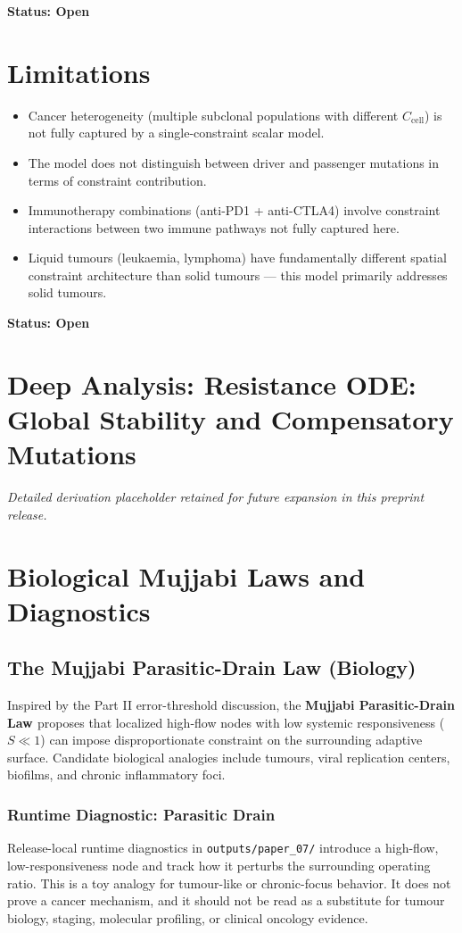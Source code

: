 \documentclass[12pt,a4paper]{article}
\begin{document}
\textbf{Status: Open}

\section{Limitations}

\begin{itemize}
    \item Cancer heterogeneity (multiple subclonal populations with different $C_{\mathrm{cell}}$) is not fully captured by a single-constraint scalar model.
    \item The model does not distinguish between driver and passenger mutations in terms of constraint contribution.
    \item Immunotherapy combinations (anti-PD1 + anti-CTLA4) involve constraint interactions between two immune pathways not fully captured here.
    \item Liquid tumours (leukaemia, lymphoma) have fundamentally different spatial constraint architecture than solid tumours --- this model primarily addresses solid tumours.
\end{itemize}

\textbf{Status: Open}


\section{Deep Analysis: Resistance ODE: Global Stability and Compensatory Mutations}
\noindent\textit{Detailed derivation placeholder retained for future expansion in this preprint release.}


\section{Biological Mujjabi Laws and Diagnostics}

\subsection{The Mujjabi Parasitic-Drain Law \cite{MujjabiPartII2026} (Biology)}
Inspired by the Part II error-threshold discussion, the \textbf{Mujjabi Parasitic-Drain Law \cite{MujjabiPartII2026}} proposes that localized high-flow nodes with low systemic responsiveness ($S \ll 1$) can impose disproportionate constraint on the surrounding adaptive surface. Candidate biological analogies include tumours, viral replication centers, biofilms, and chronic inflammatory foci.

\subsubsection{Runtime Diagnostic: Parasitic Drain}
Release-local runtime diagnostics in \texttt{outputs/paper\_07/} introduce a high-flow, low-responsiveness node and track how it perturbs the surrounding operating ratio. This is a toy analogy for tumour-like or chronic-focus behavior. It does not prove a cancer mechanism, and it should not be read as a substitute for tumour biology, staging, molecular profiling, or clinical oncology evidence.
\end{document}
